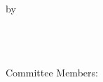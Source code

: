 \doublespacing
\begin{titlepage}
    \begin{center}
        \begingroup
        \myTITLE \\[2.5em]
        \endgroup
        by \\[2.5em]
        \myName\\[2.2em]
        
        \mySubtitle
        \myDegree \\

        \myTime\\[8.8em]
    \end{center} 
    
    Committee Members: \\
    \indent\indent\indent\myCommitteeOne \\
    \indent\indent\indent\myCommitteeTwo \\
    \indent\indent\indent\myCommitteeThree \\

\end{titlepage}   
